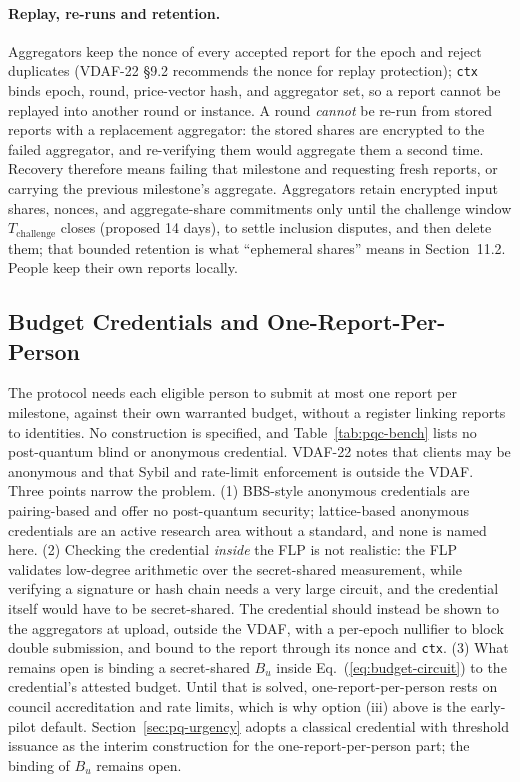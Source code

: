 \documentclass[10pt,twoside,openany]{book}
\theoremstyle{dpepstyle}
\begin{document}
\paragraph{Replay, re-runs and retention.}
Aggregators keep the nonce of every accepted report for the epoch and reject duplicates (VDAF-22 \S 9.2 recommends the nonce for replay protection); \texttt{ctx} binds epoch, round, price-vector hash, and aggregator set, so a report cannot be replayed into another round or instance. A round \emph{cannot} be re-run from stored reports with a replacement aggregator: the stored shares are encrypted to the failed aggregator, and re-verifying them would aggregate them a second time. Recovery therefore means failing that milestone and requesting fresh reports, or carrying the previous milestone's aggregate. Aggregators retain encrypted input shares, nonces, and aggregate-share commitments only until the challenge window $T_{\text{challenge}}$ closes (proposed 14 days), to settle inclusion disputes, and then delete them; that bounded retention is what ``ephemeral shares'' means in Section~11.2. People keep their own reports locally.

\subsection{Budget Credentials and One-Report-Per-Person}
\label{sec:bu-cred}
The protocol needs each eligible person to submit at most one report per milestone, against their own warranted budget, without a register linking reports to identities. No construction is specified, and Table~\ref{tab:pqc-bench} lists no post-quantum blind or anonymous credential. VDAF-22 notes that clients may be anonymous and that Sybil and rate-limit enforcement is outside the VDAF. Three points narrow the problem. (1) BBS-style anonymous credentials are pairing-based and offer no post-quantum security; lattice-based anonymous credentials are an active research area without a standard, and none is named here. (2) Checking the credential \emph{inside} the FLP is not realistic: the FLP validates low-degree arithmetic over the secret-shared measurement, while verifying a signature or hash chain needs a very large circuit, and the credential itself would have to be secret-shared. The credential should instead be shown to the aggregators at upload, outside the VDAF, with a per-epoch nullifier to block double submission, and bound to the report through its nonce and \texttt{ctx}. (3) What remains open is binding a secret-shared $B_u$ inside Eq.~(\ref{eq:budget-circuit}) to the credential's attested budget. Until that is solved, one-report-per-person rests on council accreditation and rate limits, which is why option (iii) above is the early-pilot default. Section~\ref{sec:pq-urgency} adopts a classical credential with threshold issuance as the interim construction for the one-report-per-person part; the binding of $B_u$ remains open.
\end{document}
